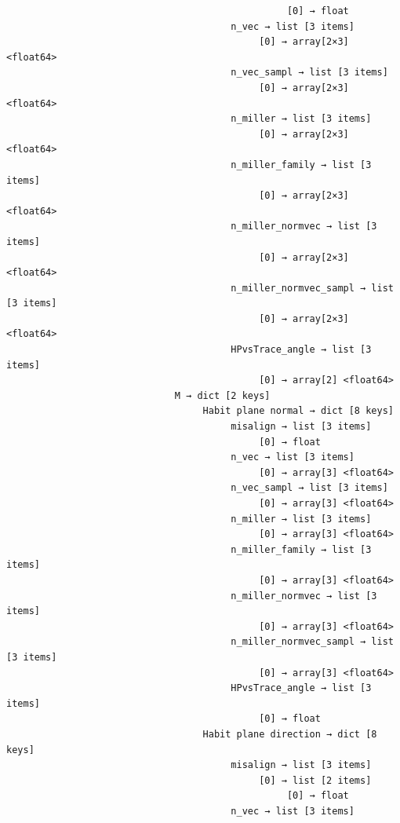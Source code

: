\documentclass[a4paper,10pt]{article}
\begin{document}
\begin{verbatim}
                                                  [0] → float
                                        n_vec → list [3 items]
                                             [0] → array[2×3] <float64>
                                        n_vec_sampl → list [3 items]
                                             [0] → array[2×3] <float64>
                                        n_miller → list [3 items]
                                             [0] → array[2×3] <float64>
                                        n_miller_family → list [3 items]
                                             [0] → array[2×3] <float64>
                                        n_miller_normvec → list [3 items]
                                             [0] → array[2×3] <float64>
                                        n_miller_normvec_sampl → list [3 items]
                                             [0] → array[2×3] <float64>
                                        HPvsTrace_angle → list [3 items]
                                             [0] → array[2] <float64>
                              M → dict [2 keys]
                                   Habit plane normal → dict [8 keys]
                                        misalign → list [3 items]
                                             [0] → float
                                        n_vec → list [3 items]
                                             [0] → array[3] <float64>
                                        n_vec_sampl → list [3 items]
                                             [0] → array[3] <float64>
                                        n_miller → list [3 items]
                                             [0] → array[3] <float64>
                                        n_miller_family → list [3 items]
                                             [0] → array[3] <float64>
                                        n_miller_normvec → list [3 items]
                                             [0] → array[3] <float64>
                                        n_miller_normvec_sampl → list [3 items]
                                             [0] → array[3] <float64>
                                        HPvsTrace_angle → list [3 items]
                                             [0] → float
                                   Habit plane direction → dict [8 keys]
                                        misalign → list [3 items]
                                             [0] → list [2 items]
                                                  [0] → float
                                        n_vec → list [3 items]

\end{verbatim}
\end{document}
